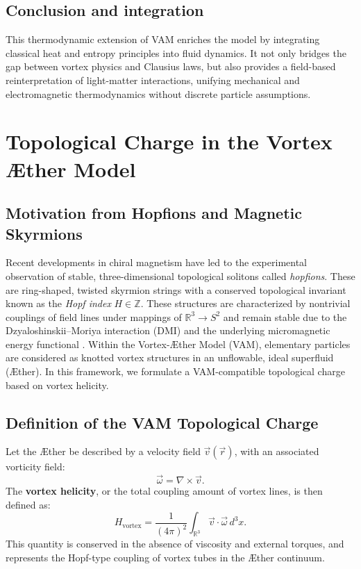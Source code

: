 \documentclass[preprint]{revtex4-2}
\begin{document}
\subsection*{Conclusion and integration}

This thermodynamic extension of VAM enriches the model by integrating classical heat and entropy principles into fluid dynamics. It not only bridges the gap between vortex physics and Clausius laws, but also provides a field-based reinterpretation of light-matter interactions, unifying mechanical and electromagnetic thermodynamics without discrete particle assumptions.
\section{Topological Charge in the Vortex Æther Model}\label{sec:appendix:9}

\subsection{Motivation from Hopfions and Magnetic Skyrmions}

Recent developments in chiral magnetism have led to the experimental observation of stable, three-dimensional topological solitons called \emph{hopfions}. These are ring-shaped, twisted skyrmion strings with a conserved topological invariant known as the \emph{Hopf index} $H \in \mathbb{Z}$. These structures are characterized by nontrivial couplings of field lines under mappings of $\mathbb{R}^3 \to S^2$ and remain stable due to the Dzyaloshinskii–Moriya interaction (DMI) and the underlying micromagnetic energy functional \cite{Zheng2023Hopfions}. Within the Vortex-Æther Model (VAM), elementary particles are considered as knotted vortex structures in an unflowable, ideal superfluid (Æther). In this framework, we formulate a VAM-compatible topological charge based on vortex helicity.

\subsection{Definition of the VAM Topological Charge}

Let the Æther be described by a velocity field $\vec{v}(\vec{r})$, with an associated vorticity field:
\begin{equation}
    \vec{\omega} = \nabla \times \vec{v}.
\end{equation}
The \textbf{vortex helicity}, or the total coupling amount of vortex lines, is then defined as:
\begin{equation}
    H_\text{vortex} = \frac{1}{(4\pi)^2} \int_{\mathbb{R}^3} \vec{v} \cdot \vec{\omega} \, d^3x.
    \label{eq:helicity}
\end{equation}
This quantity is conserved in the absence of viscosity and external torques, and represents the Hopf-type coupling of vortex tubes in the Æther continuum.
\end{document}
